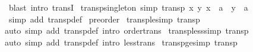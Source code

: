 \begin{isabellebody}
%
\isatagproof
{}\isamarkupfalse%
\ {\isacharparenleft}{\kern0pt}blast\ intro{\isacharcolon}{\kern0pt}\ transI{\isacharparenright}{\kern0pt}%
\endisatagproof
{\isafoldproof}%
%
\isadelimproof
\isanewline
%
\endisadelimproof
\isanewline
{}\isamarkupfalse%
\ transp{\isacharunderscore}{\kern0pt}singleton\ {\isacharbrackleft}{\kern0pt}simp{\isacharbrackright}{\kern0pt}{\isacharcolon}{\kern0pt}\ {\isachardoublequoteopen}transp\ {\isacharparenleft}{\kern0pt}{\isasymlambda}x\ y{\isachardot}{\kern0pt}\ x\ {\isacharequal}{\kern0pt}\ a\ {\isasymand}\ y\ {\isacharequal}{\kern0pt}\ a{\isacharparenright}{\kern0pt}{\isachardoublequoteclose}\isanewline
%
\isadelimproof
\ \ %
\endisadelimproof
%
\isatagproof
{}\isamarkupfalse%
\ {\isacharparenleft}{\kern0pt}simp\ add{\isacharcolon}{\kern0pt}\ transp{\isacharunderscore}{\kern0pt}def{\isacharparenright}{\kern0pt}%
\endisatagproof
{\isafoldproof}%
%
\isadelimproof
\isanewline
%
\endisadelimproof
\isanewline
{}\isamarkupfalse%
\ preorder\isanewline
{}\isanewline
\isanewline
{}\isamarkupfalse%
\ transp{\isacharunderscore}{\kern0pt}le{\isacharbrackleft}{\kern0pt}simp{\isacharbrackright}{\kern0pt}{\isacharcolon}{\kern0pt}\ {\isachardoublequoteopen}transp\ {\isacharparenleft}{\kern0pt}{\isasymle}{\isacharparenright}{\kern0pt}{\isachardoublequoteclose}\isanewline
%
\isadelimproof
%
\endisadelimproof
%
\isatagproof
{}\isamarkupfalse%
{\isacharparenleft}{\kern0pt}auto\ simp\ add{\isacharcolon}{\kern0pt}\ transp{\isacharunderscore}{\kern0pt}def\ intro{\isacharcolon}{\kern0pt}\ order{\isacharunderscore}{\kern0pt}trans{\isacharparenright}{\kern0pt}%
\endisatagproof
{\isafoldproof}%
%
\isadelimproof
\isanewline
%
\endisadelimproof
\isanewline
{}\isamarkupfalse%
\ transp{\isacharunderscore}{\kern0pt}less{\isacharbrackleft}{\kern0pt}simp{\isacharbrackright}{\kern0pt}{\isacharcolon}{\kern0pt}\ {\isachardoublequoteopen}transp\ {\isacharparenleft}{\kern0pt}{\isacharless}{\kern0pt}{\isacharparenright}{\kern0pt}{\isachardoublequoteclose}\isanewline
%
\isadelimproof
%
\endisadelimproof
%
\isatagproof
{}\isamarkupfalse%
{\isacharparenleft}{\kern0pt}auto\ simp\ add{\isacharcolon}{\kern0pt}\ transp{\isacharunderscore}{\kern0pt}def\ intro{\isacharcolon}{\kern0pt}\ less{\isacharunderscore}{\kern0pt}trans{\isacharparenright}{\kern0pt}%
\endisatagproof
{\isafoldproof}%
%
\isadelimproof
\isanewline
%
\endisadelimproof
\isanewline
{}\isamarkupfalse%
\ transp{\isacharunderscore}{\kern0pt}ge{\isacharbrackleft}{\kern0pt}simp{\isacharbrackright}{\kern0pt}{\isacharcolon}{\kern0pt}\ {\isachardoublequoteopen}transp\ {\isacharparenleft}{\kern0pt}{\isasymge}{\isacharparenright}{\kern0pt}{\isachardoublequoteclose}\isanewline

\end{isabellebody}
